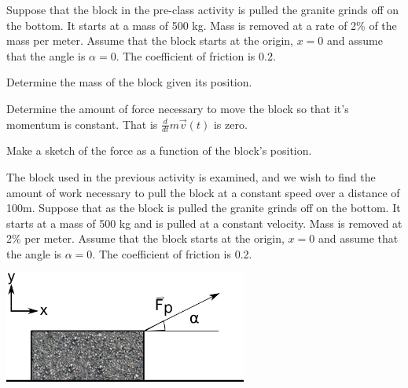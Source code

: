 \begin{problem}
\begin{subproblem}
      \vfill

%
      \vfill

%

  \end{subproblem}


\end{problem}


\begin{problem}
\item Suppose that the block in the pre-class activity is pulled the
  granite grinds off on the bottom. It starts at a mass of 500
  kg. Mass is removed at a rate of 2\% of the mass per meter. Assume
  that the block starts at the origin, $x=0$ and assume that the angle
  is $\alpha=0$. The coefficient of friction is 0.2.

  \begin{subproblem}
  \item Determine the mass of the block given its position.
    \vfill
  \item Determine the amount of force necessary to move the block so
    that it's momentum is constant. That is
    $\frac{d}{dt} m \vec{v}(t)$ is zero.
    \vfill
  \item Make a sketch of the force as a function of the block's
    position.

    \vfill
  \end{subproblem}

\clearpage

\item The block used in the previous activity is examined, and we wish
  to find the amount of work necessary to pull the block at a constant
  speed over a distance of 100m.  Suppose that as the block is pulled
  the granite grinds off on the bottom. It starts at a mass of 500 kg
  and is pulled at a constant velocity. Mass is removed at 2\% per
  meter. Assume that the block starts at the origin, $x=0$ and assume
  that the angle is $\alpha=0$. The coefficient of friction is 0.2.

  \includegraphics[width=8cm]{ink/week7/dragBlock}


\end{problem}
